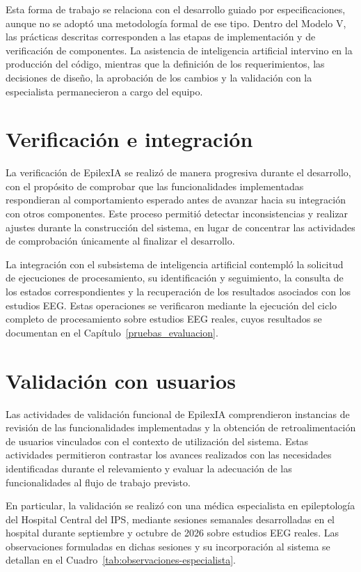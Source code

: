 Esta forma de trabajo se relaciona con el desarrollo guiado por especificaciones, aunque no se adoptó una metodología formal de ese tipo.
Dentro del Modelo V, las prácticas descritas corresponden a las etapas de implementación y de verificación de componentes.
La asistencia de inteligencia artificial intervino en la producción del código, mientras que la definición de los requerimientos, las decisiones de diseño, la aprobación de los cambios y la validación con la especialista permanecieron a cargo del equipo.

\section{Verificación e integración}
\label{sec:verificacion-integracion}

La verificación de EpilexIA se realizó de manera progresiva durante el
desarrollo, con el propósito de comprobar que las funcionalidades
implementadas respondieran al comportamiento esperado antes de avanzar hacia
su integración con otros componentes. Este proceso permitió detectar
inconsistencias y realizar ajustes durante la construcción del sistema, en
lugar de concentrar las actividades de comprobación únicamente al finalizar
el desarrollo.

La integración con el subsistema de inteligencia artificial contempló
la solicitud de ejecuciones de procesamiento, su identificación y
seguimiento, la consulta de los estados correspondientes y la
recuperación de los resultados asociados con los estudios EEG.
Estas operaciones se verificaron mediante la ejecución del ciclo completo de procesamiento sobre estudios EEG reales, cuyos resultados se documentan en el Capítulo~\ref{pruebas_evaluacion}.

\section{Validación con usuarios}
\label{sec:validacion-usuarios}

Las actividades de validación funcional de EpilexIA comprendieron
instancias de revisión de las funcionalidades implementadas y la
obtención de retroalimentación de usuarios vinculados con el
contexto de utilización del sistema. Estas actividades permitieron
contrastar los avances realizados con las necesidades identificadas
durante el relevamiento y evaluar la adecuación de las
funcionalidades al flujo de trabajo previsto.

En particular, la validación se realizó con una médica especialista en epileptología del Hospital Central del IPS, mediante sesiones semanales desarrolladas en el hospital durante septiembre y octubre de 2026 sobre estudios EEG reales.
Las observaciones formuladas en dichas sesiones y su incorporación al sistema se detallan en el Cuadro~\ref{tab:observaciones-especialista}.


